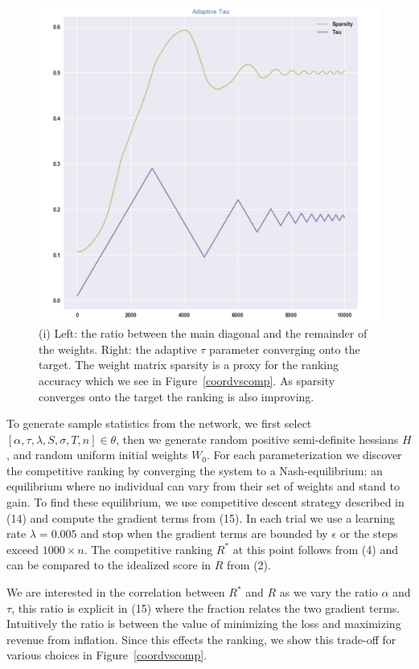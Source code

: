 \documentclass{article}
\begin{document}
\begin{figure}[!htb]
	\centering
	\includegraphics[scale=.27]{images/adaptive_tau.png}
	\caption{(i) Left: the ratio between the main diagonal and the remainder of the weights. Right: the adaptive $\tau$ parameter converging onto the target. The weight matrix sparsity is a proxy for the ranking accuracy which we see in Figure~\ref{coordvscomp}. As sparsity converges onto the target the ranking is also improving.}
	\label{adaptive_tau}
\end{figure}


To generate sample statistics from the network, we first select $[\alpha, \tau, \lambda, S, \sigma, T, n] \in \theta$, then we generate random positive semi-definite hessians $H$, and random uniform initial weights $W_0$. For each parameterization we discover the competitive ranking by converging the system to a Nash-equilibrium: an equilibrium where no individual can vary from their set of weights and stand to gain. \cite{dtting2017optimal} To find these equilibrium, we use competitive descent strategy described in (14) and compute the gradient terms from (15). In each trial we use a learning rate $\lambda = 0.005$ and stop when the gradient terms are bounded by $\epsilon$ or the steps exceed $1000 \times n$. The competitive ranking $R^*$ at this point follows from (4) and can be compared to the idealized score in $R$ from (2).
\smallskip

We are interested in the correlation between $R^*$ and $R$ as we vary the ratio $\alpha$ and $\tau$, this ratio is explicit in (15) where the fraction relates the two gradient terms. Intuitively the ratio is between the value of minimizing the loss and maximizing revenue from inflation. Since this effects the ranking, we show this trade-off for various choices in Figure~\ref{coordvscomp}. 
\smallskip
\end{document}
